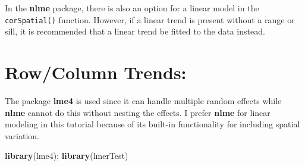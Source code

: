 \documentclass[
]{book}
\newenvironment{Shaded}{\begin{snugshade}}{\end{snugshade}}
\newcommand{\AttributeTok}[1]{\textcolor[rgb]{0.13,0.29,0.53}{#1}}
\newcommand{\CommentTok}[1]{\textcolor[rgb]{0.56,0.35,0.01}{\textit{#1}}}
\newcommand{\DecValTok}[1]{\textcolor[rgb]{0.00,0.00,0.81}{#1}}
\newcommand{\FunctionTok}[1]{\textcolor[rgb]{0.13,0.29,0.53}{\textbf{#1}}}
\newcommand{\NormalTok}[1]{#1}
\newcommand{\OtherTok}[1]{\textcolor[rgb]{0.56,0.35,0.01}{#1}}
\newcommand{\SpecialCharTok}[1]{\textcolor[rgb]{0.81,0.36,0.00}{\textbf{#1}}}
\newcommand{\StringTok}[1]{\textcolor[rgb]{0.31,0.60,0.02}{#1}}
\begin{document}
In the \textbf{nlme} package, there is also an option for a linear model in the \texttt{corSpatial()} function. However, if a linear trend is present without a range or sill, it is recommended that a linear trend be fitted to the data instead.

\hypertarget{rowcolumn-trends}{%
\section{Row/Column Trends:}\label{rowcolumn-trends}}

The package \textbf{lme4} is used since it can handle multiple random effects while \textbf{nlme} cannot do this without nesting the effects. I prefer \textbf{nlme} for linear modeling in this tutorial because of its built-in functionality for including spatial variation.

\begin{Shaded}
\begin{Highlighting}[]
\FunctionTok{library}\NormalTok{(lme4); }\FunctionTok{library}\NormalTok{(lmerTest)}
\end{Highlighting}
\end{Shaded}

\begin{Shaded}
\end{Shaded}
\end{document}
